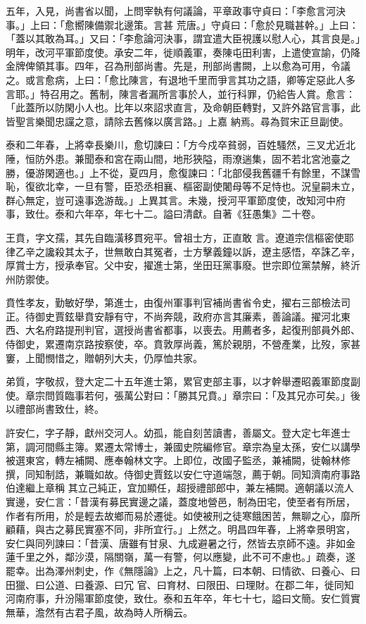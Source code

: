 \begin{pinyinscope}
 五年，入見，尚書省以聞，上問宰執有何議論，平章政事守貞曰：「李愈言河決事。」上曰：「愈嚮陳備禦北邊策。言甚
 荒唐。」守貞曰：「愈於見職甚幹。」上曰：「蓋以其敢為耳。」又曰：「李愈論河決事，謂宜遣大臣視護以慰人心，其言良是。」明年，改河平軍節度使。承安二年，徙順義軍，奏陳屯田利害，上遣使宣諭，仍降金牌俾領其事。四年，召為刑部尚書。先是，刑部尚書闕，上以愈為可用，令議之。或言愈病，上曰：「愈比陳言，有退地千里而爭言其功之語，卿等定惡此人多言耶。」特召用之。舊制，陳言者漏所言事於人，並行科罪，仍給告人賞。愈言：「此蓋所以防閑小人也。比年以來詔求直言，及命朝臣轉對，又許外路官言事，此皆聖言樂聞忠讜之意，請除去舊條以廣言路。」上嘉
 納焉。尋為賀宋正旦副使。



 泰和二年春，上將幸長樂川，愈切諫曰：「方今戍卒貧弱，百姓騷然，三叉尤近北陲，恒防外患。兼聞泰和宮在兩山間，地形狹隘，雨潦遄集，固不若北宮池臺之勝，優游閑適也。」上不從，夏四月，愈復諫曰：「北部侵我舊疆千有餘里，不謀雪恥，復欲北幸，一旦有警，臣恐丞相襄、樞密副使闍母等不足恃也。況皇嗣未立，群心無定，豈可遠事逸游哉。」上異其言。未幾，授河平軍節度使，改知河中府事，致仕。泰和六年卒，年七十二。謚曰清獻。自著《狂愚集》二十卷。



 王賁，字文孺，其先自臨潢移貫宛平。曾祖士方，正直敢
 言。遼道宗信樞密使耶律乙辛之讒殺其太子，世無敢白其冤者，士方擊義鐘以訴，遼主感悟，卒誅乙辛，厚賞士方，授承奉官。父中安，擢進士第，坐田玨黨事廢。世宗即位黨禁解，終沂州防禦使。



 賁性孝友，勤敏好學，第進士，由復州軍事判官補尚書省令史，擢右三部檢法司正。待御史賈鉉舉賁安靜有守，不尚奔競，政府亦言其廉素，善論議。擢河北東西、大名府路提刑判官，選授尚書省都事，以喪去。用薦者多，起復刑部員外郎、侍御史，累遷南京路按察使，卒。賁敦厚尚義，篤於親朋，不營產業，比歿，家甚窶，上聞憫惜之，贈朝列大夫，仍厚恤共家。



 弟質，字敬叔，登大定二十五年進士第，累官吏部主事，以才幹舉遷昭義軍節度副使。章宗問質臨事若何，張萬公對曰：「勝其兄賁。」章宗曰：「及其兄亦可矣。」後以禮部尚書致仕，終。



 許安仁，字子靜，獻州交河人。幼孤，能自刻苦讀書，善屬文。登大定七年進士第，調河間縣主簿。累遷太常博士，兼國史院編修官。章宗為皇太孫，安仁以講學被選東宮，轉左補闕、應奉翰林文字。上即位，改國子監丞，兼補闕，徙翰林修撰，同知制誥，兼職如故。侍御史賈鉉以安仁守道端愨，薦于朝。同知濟南府事路伯達繼上章稱
 其立己純正，宜加顯任，超授禮部郎中，兼左補闕。適朝議以流人實邊，安仁言：「昔漢有募民實邊之議，蓋度地營邑，制為田宅，使至者有所居，作者有所用，於是輕去故鄉而易於遷徙。如使被刑之徒寒餓困苦，無聊之心，靡所顧藉，與古之募民實塞不同，非所宜行。」上然之。明昌四年春，上將幸景明宮，安仁與同列諫曰：「昔漢、唐雖有甘泉、九成避暑之行，然皆去京師不遠。非如金蓮千里之外，鄰沙漠，隔關嶺，萬一有警，何以應變，此不可不慮也。」疏奏，遂罷幸。出為澤州刺史，作《無隱論》上之，凡十篇，曰本朝、曰情欲、曰養心、曰田獵、曰公道、曰養源、曰冗
 官、曰育材、曰限田、曰理財。在郡二年，徙同知河南府事，升汾陽軍節度使，致仕。泰和五年卒，年七十七，謚曰文簡。安仁質實無華，澹然有古君子風，故為時人所稱云。




\end{pinyinscope}
